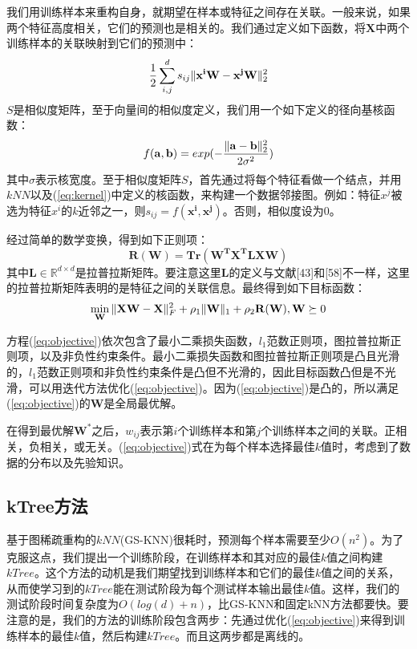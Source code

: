 \documentclass{ctexart}
\begin{document}
	我们用训练样本来重构自身，就期望在样本或特征之间存在关联。一般来说，如果两个特征高度相关，它们的预测也是相关的。我们通过定义如下函数，将$ \mathbf{X} $中两个训练样本的关联映射到它们的预测中：
	\begin{equation}
	\frac{1}{2}\sum_{i,j}^{d}s_{ij}\Arrowvert{\mathbf{x^iW-x^jW}}\Arrowvert_2^2
	\end{equation}
	$ S $是相似度矩阵，至于向量间的相似度定义，我们用一个如下定义的径向基核函数：
	\begin{equation}
		f(\mathbf{a,b}) = exp(-\frac{\Arrowvert \mathbf{a-b} \Arrowvert_2^2}{2\sigma^2}) \label{eq:kernel}
	\end{equation}
	其中$\sigma$表示核宽度。至于相似度矩阵$ S $，首先通过将每个特征看做一个结点，并用$ kNN $以及(\ref{eq:kernel})中定义的核函数，来构建一个数据邻接图。例如：特征$ x^j $被选为特征$ x^i $的$ k $近邻之一，则$ s_{ij} = f(\mathbf{x^i, x^j}) $。否则，相似度设为0。
	
	经过简单的数学变换，得到如下正则项：
	\begin{equation}
		\mathbf{R(W)} = \mathbf{Tr(W^TX^TLXW)}
	\end{equation}
	其中$ \mathbf L \in \mathbb{R}^{d \times d} $是拉普拉斯矩阵。要注意这里$ \mathbf L $的定义与文献[43]和[58]不一样，这里的拉普拉斯矩阵表明的是特征之间的关联信息。最终得到如下目标函数：
	\begin{equation}
	\min_\mathbf{W} \Arrowvert{\mathbf{XW-X}}\Arrowvert_{F}^{2} + \rho_1 \Arrowvert{\mathbf W}\Arrowvert_1 + \rho_2 \mathbf{R(W)},\mathbf W \succeq 0 \label{eq:objective}
	\end{equation}
	
	方程(\ref{eq:objective})依次包含了最小二乘损失函数，$ l_1 $范数正则项，图拉普拉斯正则项，以及非负性约束条件。最小二乘损失函数和图拉普拉斯正则项是凸且光滑的，$ l_1 $范数正则项和非负性约束条件是凸但不光滑的，因此目标函数凸但是不光滑，可以用迭代方法优化(\ref{eq:objective})。因为(\ref{eq:objective})是凸的，所以满足(\ref{eq:objective})的$ \mathbf W $是全局最优解。
	
	在得到最优解$ \mathbf W^* $之后，$ w_{ij} $表示第$ i $个训练样本和第$ j $个训练样本之间的关联。正相关，负相关，或无关。(\ref{eq:objective})式在为每个样本选择最佳$ k $值时，考虑到了数据的分布以及先验知识。
	
	\subsection{kTree方法}
	基于图稀疏重构的$ kNN $(GS-KNN)很耗时，预测每个样本需要至少$ O(n^2) $。为了克服这点，我们提出一个训练阶段，在训练样本和其对应的最佳$ k $值之间构建$ kTree $。这个方法的动机是我们期望找到训练样本和它们的最佳$ k $值之间的关系，从而使学习到的$ kTree $能在测试阶段为每个测试样本输出最佳$ k $值。这样，我们的测试阶段时间复杂度为$ O(log(d)+n) $，比GS-KNN和固定kNN方法都要快。要注意的是，我们的方法的训练阶段包含两步：先通过优化(\ref{eq:objective})来得到训练样本的最佳$ k $值，然后构建$ kTree $。而且这两步都是离线的。
	
\end{document}
